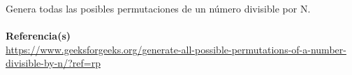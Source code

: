 Genera todas las posibles permutaciones de un número divisible por N. \\{ }\\
\textbf{Referencia(s)}\\

\href{https://www.geeksforgeeks.org/generate-all-possible-permutations-of-a-number-divisible-by-n/?ref=rp}{https://www.geeksforgeeks.org/generate-all-possible-permutations-of-a-number-divisible-by-n/?ref=rp}